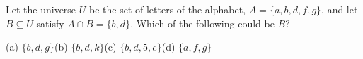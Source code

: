 Let the universe $U$ be the set of letters of the alphabet, $A=\{a,b,d,f,g\}$, and let $B\subseteq U$ satisfy $A\cap B=\{b,d\}$. Which of the following could be $B$?

(a) $\{b,d,g\}$\qquad (b) $\{b,d,k\}$\qquad (c) $\{b,d,5,e\}$\qquad (d) $\{a,f,g\}$
